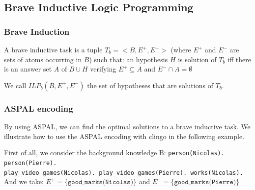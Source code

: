 
\subsection{Brave Inductive Logic Programming}

\subsubsection{Brave Induction}

A brave inductive task is a tuple $T_b=<B, E^+, E^->$ (where $E^+$ and $E^-$ are sets of atoms occurring in $B$) such that: an hypothesis $H$ is solution of $T_b$ iff there is an answer set $A$ of $B\cup H$ verifying $E^+\subseteq A$ and $E^-\cap A = \emptyset$

\smallskip

We call $ILP_b(B,E^+,E^-)$ the set of hypotheses that are solutions of $T_b$. 

\subsubsection{ASPAL encoding}

By using ASPAL, we can find the optimal solutions to a brave inductive task. We
illustrate how to use the ASPAL encoding with clingo in the following example.\bigskip

First of all, we consider the background knowledge B:\newline
\texttt{person(Nicolas). person(Pierre).\\
play\_video games(Nicolas). play\_video\_games(Pierre). works(Nicolas).}\\

And we take: $E^+=\{\texttt{good\_marks(Nicolas)}\}$ and $E^-=\{\texttt{good\_marks(Pierre)}\}$

